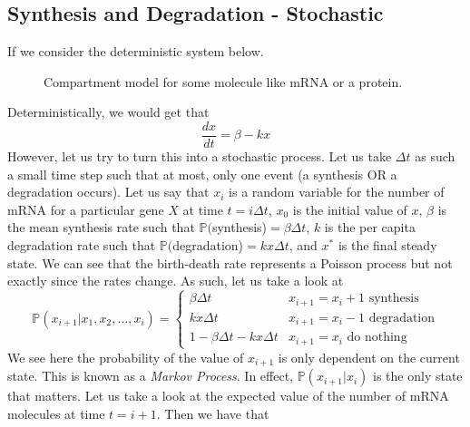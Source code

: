 \documentclass{article}
\newcommand{\od}[2]{\frac{d #1}{d #2}}
\newcommand{\p}{\mathbb{P}}
\theoremstyle{definition}
\begin{document}
\subsection{Synthesis and Degradation - Stochastic}
If we consider the deterministic system below.
\begin{figure}[htbp]
    \centering
    \caption{Compartment model for some molecule like mRNA or a protein.}
\end{figure}
Deterministically, we would get that 
\begin{equation*}
    \od{x}{t} = \beta - kx
\end{equation*}
However, let us try to turn this into a stochastic process. Let us take $\Delta t$ as such a small time step such that at most, only one event (a synthesis OR a degradation occurs). Let us say that $x_i$ is a random variable for the number of mRNA for a particular gene $X$ at time $t=i\Delta t$, $x_0$ is the initial value of $x$, $\beta$ is the mean synthesis rate such that $\p($synthesis)$=\beta \Delta t$, $k$ is the per capita degradation rate such that $\p($degradation)$=kx\Delta t$, and $x^*$ is the final steady state. We can see that the birth-death rate represents a Poisson process but not exactly since the rates change. As such, let us take a look at 
\begin{equation*}
    \p (x_{i+1}| x_1,x_2,\ldots,x_i) = \begin{cases}
        \beta \Delta t & x_{i+1}=x_i + 1 \text{ synthesis} \\ kx\Delta t & x_{i+1} = x_i -1 \text{ degradation} \\ 1-\beta \Delta t-kx\Delta t& x_{i+1}=x_i \text{ do nothing}
    \end{cases}
\end{equation*}
We see here the probability of the value of $x_{i+1}$ is only dependent on the current state. This is known as a \emph{Markov Process}. In effect, $\p (x_{i+1}|x_i)$ is the only state that matters. Let us take a look at the expected value of the number of mRNA molecules at time $t=i+1$. Then we have that 
\end{document}
